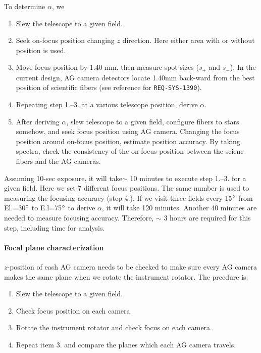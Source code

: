 To determine $\alpha$, we 
\begin{enumerate}
\item Slew the telescope to a given field.
\item Seek on-focus position changing $z$ direction. 
Here either area with or without position is used.
\item Move focus position by 1.40 mm, then measure spot sizes ($s_+$ and $s_-$).
In the current design, AG camera detectors locate 1.40mm back-ward from the best position of scientific fibers (see reference for {\tt REQ-SYS-1390}).
\item Repeating step 1.--3. at a various telescope position, derive $\alpha$.
\item After deriving $\alpha$, slew telescope to a given field, configure fibers to stars somehow, and seek focus position using AG camera.
Changing the focus position around on-focus position, estimate position accuracy.
By taking spectra, check the consistency of the on-focus position between the scienc fibers and the AG cameras.
\end{enumerate}

Assuming 10-sec exposure, it will take$\sim$ 10 minutes to execute step 1.--3. for a given field.
Here we set 7 different focus positions.
The same number is used to measuring the focusing accuracy (step 4.).
If we visit three fields every 15$^\circ$ from El.=30$^\circ$ to E.l=75$^\circ$ to derive $\alpha$, it will take 120 minutes.
Another 40 minutes are needed to measure focusing accuracy.
Therefore, $\sim$ 3 hours are required for this step, including time for analysis.

\paragraph{Focal plane characterization}
$z$-position of eash AG camera needs to be checked to make sure every AG camera makes the same plane when we rotate the instrument rotator.
The prcedure is:
\begin{enumerate}
\item Slew the telescope to a given field.
\item Check focus position on each camera.
\item Rotate the instrument rotator and check focus on each camera.
\item Repeat item 3. and compare the planes which each AG camera travels.
\end{enumerate}

